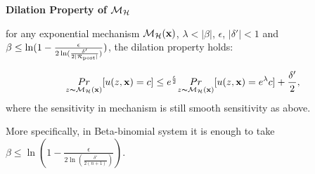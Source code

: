 \documentclass{article}
\begin{document}
\noindent \textbf{Dilation Property of $\mathcal{M}_{\mathcal{H}}$}
\begin{lem}
for any exponential mechanism $\mathcal{M}_{\mathcal{H}}(\textbf{x})$, $\lambda < |\beta|$, $\epsilon$, $|\delta'| < 1$ and $\beta \leq \ln(1 - \frac{\epsilon}{2 \ln (\frac{\delta'}{2 |\mathcal{R}_{\textup{post}}|})})$, the dilation property holds:

\begin{equation*}
\underset{z \thicksim \mathcal{M}_{\mathcal{H}}(\textbf{x})}{Pr}[u(z,\textbf{x}) = c]
\leq
e^{\frac{\epsilon}{2}} \underset{z \thicksim \mathcal{M}_{\mathcal{H}}(\textbf{x})}{Pr}[u(z,\textbf{x}) = e^{\lambda} c] + \frac{\delta'}{2},
\end{equation*}
where the sensitivity in mechanism is still smooth sensitivity as above.

More specifically, in Beta-binomial system it is enough to take $\beta \leq \ln(1 - \frac{\epsilon}{2 \ln (\frac{\delta'}{2 (n + 1)})})$.
\end{lem}
\end{document}
